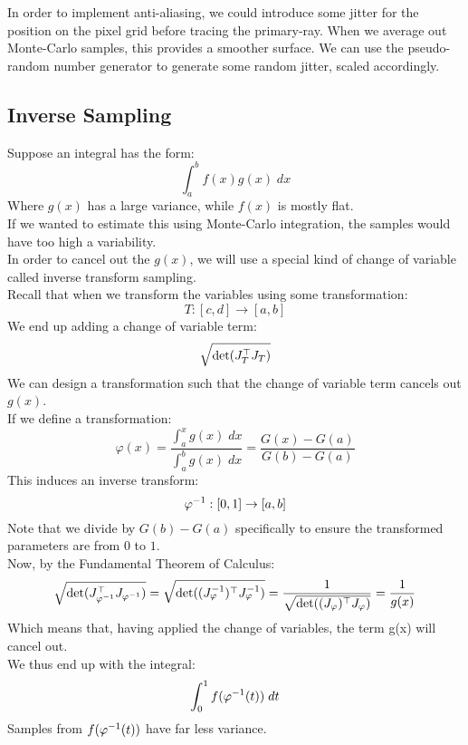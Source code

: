\documentclass[12pt]{article}
\begin{document}
In order to implement anti-aliasing, we could introduce
some jitter for the position on the pixel grid before
tracing the primary-ray. When we average out Monte-Carlo
samples, this provides a smoother surface.
We can use the pseudo-random number generator
to generate some random jitter, scaled accordingly. \\

\newpage

\subsection*{Inverse Sampling}

Suppose an integral has the form:
\[ \int_a^b f(x)g(x)\;dx \]
Where $g(x)$ has a large variance,
while $f(x)$ is mostly flat. \\

If we wanted to estimate this using
Monte-Carlo integration, the samples would have
too high a variability. \\

In order to cancel out the $g(x)$,
we will use a special kind of change of variable
called inverse transform sampling. \\

Recall that when we transform the variables
using some transformation:
\[ T: [c, d] \to [a, b] \]
We end up adding a change of variable term:
\[ \sqrt{\vs{100}\det(J_T^\top J_T)} \]
We can design a transformation such that the
change of variable term cancels out $g(x)$. \\

If we define a transformation:
\[ \varphi(x) = \dfrac{\int_a^x g(x) \;dx}
{\int_a^b g(x) \;dx}
= \dfrac{G(x) - G(a)}
{G(b) - G(a)} \]
This induces an inverse transform:
\[ \varphi^{-1}: [0, 1] \to [a, b] \]
Note that we divide by $G(b) - G(a)$
specifically to ensure the transformed parameters
are from $0$ to $1$. \\

Now, by the Fundamental Theorem of Calculus:
\[ \sqrt{\det(J_{\varphi^{-1}}^\top J_{\varphi^{-1}})}
= \sqrt{\det((J_{\varphi}^{-1})^\top J_{\varphi}^{-1})}
= \dfrac{1}{\sqrt{\det((J_{\varphi})^\top J_{\varphi})}}
= \dfrac{1}{g(x)}\]
Which means that, having applied the
change of variables, the term g(x)
will cancel out. \\

We thus end up with the integral:
\[ \int_0^1 f(\varphi^{-1}(t)) \; dt \]
Samples from $f(\varphi^{-1}(t))$
have far less variance. \\
\end{document}
